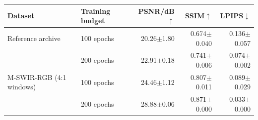 \begin{tabular}{@{}llrrr@{}}
\toprule
Dataset & Training budget & PSNR/dB$\uparrow$ & SSIM$\uparrow$ & LPIPS$\downarrow$\\
\midrule
Reference archive~\cite{chen2026thesis} & 100 epochs & 20.26$\pm$1.80 & 0.674$\pm$0.040 & 0.136$\pm$0.057 \\
 & 200 epochs & 22.91$\pm$0.18 & 0.741$\pm$0.006 & 0.074$\pm$0.002 \\
\midrule
M-SWIR-RGB (4:1 windows) & 100 epochs & 24.46$\pm$1.12 & 0.807$\pm$0.011 & 0.089$\pm$0.029 \\
 & 200 epochs & 28.88$\pm$0.06 & 0.871$\pm$0.000 & 0.033$\pm$0.000 \\
\bottomrule
\end{tabular}
